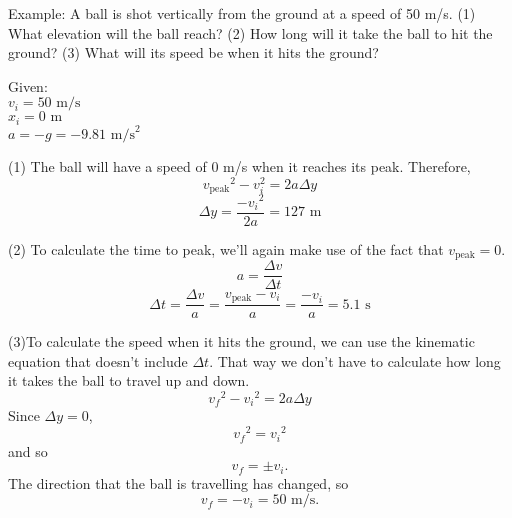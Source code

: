 Example:
A ball is shot vertically from the ground at a speed of 50 m/s. (1) What elevation will the ball reach? (2) How long will it take the ball to hit the ground? (3) What will its speed be when it hits the ground?

Given:\\
$v_i=50\mbox{ m/s}$\\
$x_i=0\mbox{ m}$\\
$a=-g=-9.81\mbox{ m/s}^2$

(1) The ball will have a speed of 0 m/s when it reaches its peak. Therefore,
$$v_{\mbox{peak}}\displaystyle^2-v_i^2=2a\Delta{y}$$
$$\Delta{y}=\frac{-v_i\displaystyle^2}{2a}=127\mbox{ m}$$

(2) To calculate the time to peak, we'll again make use of the fact that $v_{\mbox{peak}}=0$.
$$a=\frac{\Delta{v}}{\Delta{t}}$$
$$\Delta{t}=\frac{\Delta{v}}{a}=\frac{v_{\mbox{peak}}-v_i}{a}=\frac{-v_i}{a}=5.1\mbox{ s}$$

(3)To calculate the speed when it hits the ground, we can use the kinematic equation that doesn't include $\Delta{t}$. That way we don't have to calculate how long it takes the ball to travel up and down.
$$v_f\displaystyle^2-v_i\displaystyle^2=2a\Delta{y}$$
Since $\Delta{y}=0$,
$$v_f\displaystyle^2=v_i\displaystyle^2$$
and so
$$v_f=\pm v_i.$$
The direction that the ball is travelling has changed, so 
$$v_f=-v_i=50\mbox{ m/s}.$$

\clearpage

